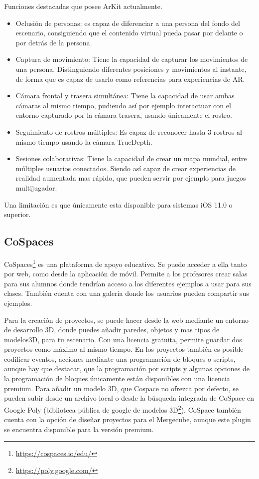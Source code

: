 Funciones destacadas que posee ArKit actualmente.

\begin{itemize}
	\item Oclusión de personas: es capaz de diferenciar a una persona del fondo del escenario, consiguiendo que el contenido virtual  pueda pasar por delante o por detrás de la persona.
	\item Captura de movimiento: Tiene la capacidad de capturar los movimientos de una persona. Distinguiendo diferentes posiciones y movimientos al instante, de forma que es capaz de usarlo como referencias para experiencias de AR.
	\item Cámara frontal y trasera simultánea: Tiene la capacidad de usar ambas cámaras al mismo tiempo, pudiendo así por ejemplo interactuar con el entorno capturado por la cámara trasera, usando únicamente el rostro.
	\item Seguimiento de rostros múltiples: Es capaz de reconocer hasta 3 rostros al mismo tiempo usando la cámara TrueDepth.
	\item Sesiones colaborativas: Tiene la capacidad de crear un mapa mundial, entre múltiples usuarios conectados. Siendo así capaz de crear experiencias de realidad aumentada mas rápido, que pueden servir por ejemplo para juegos multijugador.
\end{itemize}



Una limitación es que únicamente esta disponible para sistemas iOS 11.0 o superior.


\subsection{CoSpaces}\label{sub:Def_cospace} 

CoSpaces\footnote{\url{https://cospaces.io/edu/}} es una plataforma de apoyo educativo. Se puede acceder a ella tanto por web, como desde la aplicación de móvil. Permite a los profesores crear salas para sus alumnos donde tendrían acceso a los diferentes ejemplos a usar para sus clases. También cuenta con una galería donde los usuarios pueden compartir sus ejemplos.


Para la creación de proyectos, se puede hacer desde la web mediante un entorno de desarrollo 3D, donde puedes añadir paredes, objetos y mas tipos de modelos3D, para tu escenario. Con una licencia gratuita, permite guardar dos proyectos como máximo al mismo tiempo. En los proyectos también es posible codificar eventos, acciones mediante una programación de bloques o scripts, aunque hay que destacar, que la programación por scripts y algunas opciones de la programación de bloques únicamente están disponibles con una licencia premium. Para añadir un modelo 3D, que Cospace no ofrezca por defecto, se pueden subir desde un archivo local o desde la búsqueda integrada de CoSpace en Google Poly (biblioteca pública de google de modelos 3D\footnote{\url{https://poly.google.com/}}).
CoSpace también cuenta con la opción de diseñar proyectos para el Mergecube, aunque este plugin se encuentra disponible para la versión premium.

